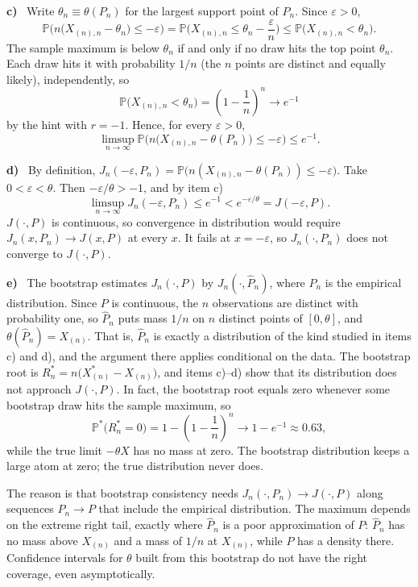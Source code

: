 \documentclass[11pt]{article}
\newcommand{\Prob}{\mathbb{P}}
\theoremstyle{plain}
\newcommand{\itm}[1]{\par\textbf{#1)}\ }
\begin{document}
\itm{c}
Write $\theta_n\equiv\theta(P_n)$ for the largest support point of $P_n$. Since $\varepsilon>0$,
\[
\Prob\Big(n\big(X_{(n),n}-\theta_n\big)\le-\varepsilon\Big) = \Prob\Big(X_{(n),n}\le\theta_n-\frac{\varepsilon}{n}\Big) \le \Prob\big(X_{(n),n}<\theta_n\big).
\]
The sample maximum is below $\theta_n$ if and only if no draw hits the top point $\theta_n$. Each draw hits it with probability $1/n$ (the $n$ points are distinct and equally likely), independently, so
\[
\Prob\big(X_{(n),n}<\theta_n\big) = \left(1-\frac1n\right)^n \longrightarrow e^{-1}
\]
by the hint with $r=-1$. Hence, for every $\varepsilon>0$,
\[
\limsup_{n\to\infty}\Prob\Big(n\big(X_{(n),n}-\theta(P_n)\big)\le-\varepsilon\Big)\le e^{-1}.
\]

\itm{d}
By definition, $J_n(-\varepsilon,P_n) = \Prob\big(n(X_{(n),n}-\theta(P_n))\le-\varepsilon\big)$. Take $0<\varepsilon<\theta$. Then $-\varepsilon/\theta>-1$, and by item c)
\[
\limsup_{n\to\infty} J_n(-\varepsilon,P_n) \le e^{-1} < e^{-\varepsilon/\theta} = J(-\varepsilon,P).
\]
$J(\cdot,P)$ is continuous, so convergence in distribution would require $J_n(x,P_n)\to J(x,P)$ at every $x$. It fails at $x=-\varepsilon$, so $J_n(\cdot,P_n)$ does not converge to $J(\cdot,P)$.

\itm{e}
The bootstrap estimates $J_n(\cdot,P)$ by $J_n(\cdot,\hat P_n)$, where $\hat P_n$ is the empirical distribution. Since $P$ is continuous, the $n$ observations are distinct with probability one, so $\hat P_n$ puts mass $1/n$ on $n$ distinct points of $[0,\theta]$, and $\theta(\hat P_n)=X_{(n)}$. That is, $\hat P_n$ is exactly a distribution of the kind studied in items c) and d), and the argument there applies conditional on the data. The bootstrap root is $R_n^* = n\big(X^*_{(n)}-X_{(n)}\big)$, and items c)--d) show that its distribution does not approach $J(\cdot,P)$. In fact, the bootstrap root equals zero whenever some bootstrap draw hits the sample maximum, so
\[
\Prob^*\big(R_n^*=0\big) = 1-\left(1-\frac1n\right)^n\longrightarrow 1-e^{-1}\approx 0.63,
\]
while the true limit $-\theta X$ has no mass at zero. The bootstrap distribution keeps a large atom at zero; the true distribution never does.

The reason is that bootstrap consistency needs $J_n(\cdot,P_n)\to J(\cdot,P)$ along sequences $P_n\to P$ that include the empirical distribution. The maximum depends on the extreme right tail, exactly where $\hat P_n$ is a poor approximation of $P$: $\hat P_n$ has no mass above $X_{(n)}$ and a mass of $1/n$ at $X_{(n)}$, while $P$ has a density there. Confidence intervals for $\theta$ built from this bootstrap do not have the right coverage, even asymptotically.
\end{document}
